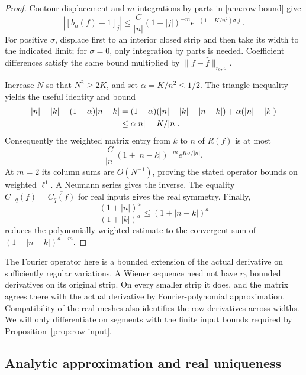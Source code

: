 \begin{proof}
Contour displacement and \(m\) integrations by parts in
\eqref{ana:row-bound} give
\begin{equation}\label{ana:coefficient-decay}
 |[b_n(f)-1]_j|\le
 \frac{C}{|n|}(1+|j|)^{-m}
 e^{-(1-K/n^2)\sigma|j|}.
\end{equation}
For positive \(\sigma\), displace first to an interior closed strip
and then take its width to the indicated limit; for \(\sigma=0\),
only integration by parts is needed.  Coefficient differences satisfy
the same bound multiplied by
\(\|f-\widehat f\|_{r_0,\sigma}\).

Increase \(N\) so that \(N^2\ge2K\), and set
\(\alpha=K/n^2\le1/2\).  The triangle inequality yields the useful
identity and bound
\begin{align}
 |n|-|k|-(1-\alpha)|n-k|
 &=(1-\alpha)(|n|-|k|-|n-k|)
       +\alpha(|n|-|k|)\notag\\
 &\le \alpha|n|=K/|n|.
 \label{ana:exponent-balance}
\end{align}
Consequently the weighted matrix entry from \(k\) to \(n\) of
\(R(f)\) is at most
\[
 \frac{C}{|n|}(1+|n-k|)^{-m}e^{K\sigma/|n|}.
\]
At \(m=2\) its column sums are \(O(N^{-1})\), proving the stated
operator bounds on weighted \(\ell^1\).  A Neumann series gives the
inverse.  The equality \(C_{-q}(f)=\overline{C_q(f)}\) for real
inputs gives the real symmetry.  Finally,
\[
 \frac{(1+|n|)^a}{(1+|k|)^a}\le(1+|n-k|)^a
\]
reduces the polynomially weighted estimate to the convergent sum
of \((1+|n-k|)^{a-m}\).
\end{proof}

The Fourier operator here is a bounded extension of the actual
derivative on sufficiently regular variations.  A Wiener sequence
need not have \(r_0\) bounded derivatives on its original strip.
On every smaller strip it does, and the matrix agrees there with
the actual derivative by Fourier-polynomial approximation.
Compatibility of the real meshes also identifies the row derivatives
across widths.  We will only differentiate on segments with the finite
input bounds required by Proposition~\ref{prop:row-input}.

\subsection{Analytic approximation and real uniqueness}

